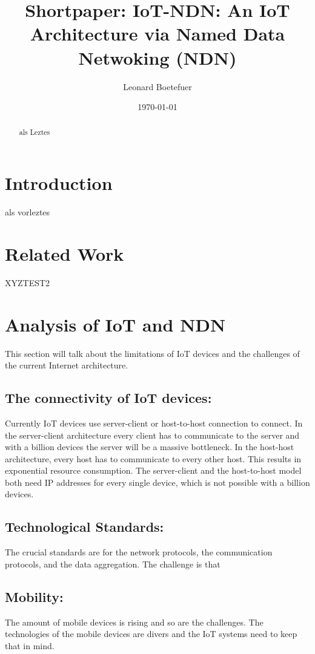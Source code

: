 \documentclass[conference]{IEEEtran}
\title{\textbf{Shortpaper:} IoT-NDN: An IoT Architecture via Named Data
Netwoking (NDN)\\}
\author{Leonard Boetefuer}
\date{\today}
\begin{document}
\maketitle

\begin{abstract}
als Leztes
\end{abstract}

\section{Introduction}
als vorleztes
\section{Related Work}
XYZTEST2
\section{Analysis of IoT and NDN}
This section will talk about the limitations of IoT devices and the challenges of the current Internet architecture.
\subsection{The connectivity of IoT devices:}
Currently IoT devices use server-client or host-to-host connection to connect. 
In the server-client architecture every client has to communicate to the server and with a billion devices the server will be a massive bottleneck. In the host-host architecture, every host has to communicate to every other host. This results in exponential resource consumption.
The server-client and the host-to-host model both need IP addresses for every single device, which is not possible with a billion devices.

\subsection{Technological Standards:}
The crucial standards are for the network protocols, the communication protocols, 
and the data aggregation. 
The challenge is that 


\subsection{Mobility:}
The amount of mobile devices is rising and so are the challenges. 
The technologies of the mobile devices are divers and the IoT systems need to keep that in mind.
\end{document}
